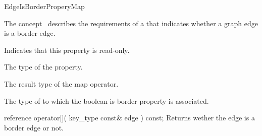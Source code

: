 
\begin{ccRefConcept}{EdgeIsBorderProperyMap}


\ccDefinition

The concept \ccRefName\ describes the requirements of a  that indicates whether a graph edge is a border edge.

\ccRefines
  
\ccTypes
    {Indicates that this property is read-only.}
  
    {The type of the property.}
    
    {The result type of the map operator.}

  {The type of  to which the boolean is-border property is associated.}

\ccCreation
{}  %

\ccOperations

\ccMethod
  {reference operator[]( key_type const& edge ) const;}
  {Returns wether the edge is a border edge or not.}  
  
\ccHasModels
{}\\

\end{ccRefConcept}



